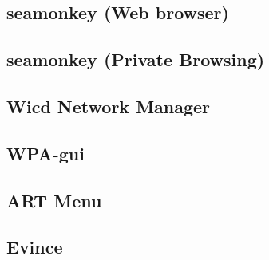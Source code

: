 \documentclass[12pt,a4paper]{book}
\begin{document}
\subsection{seamonkey (Web browser)}
\subsection{seamonkey (Private Browsing)}
\subsection{Wicd Network Manager}
\subsection{WPA-gui}
\subsection{ART Menu}
\newpage
\subsection{Evince}
\end{document}
